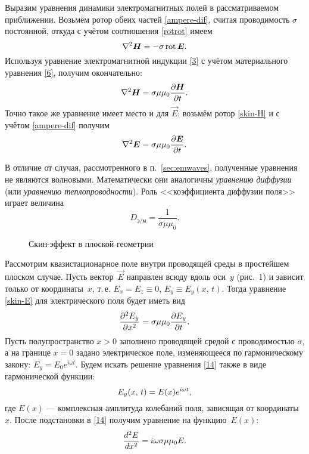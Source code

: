 Выразим уравнения динамики электромагнитных полей в рассматриваемом приближении.
Возьмём ротор обеих частей \eqref{ampere-dif}, считая проводимость $\sigma$ 
постоянной, откуда с учётом соотношения \eqref{rotrot} имеем
\begin{equation*} \eqmark{8}
\nabla^2\vec{H}= -\sigma \Rot \vec{E}.
\end{equation*}
Используя уравнение электромагнитной индукции \eqref{3} с учётом материального 
уравнения \eqref{6}, получим окончательно:
\begin{equation}\eqmark{skin-H}
\nabla^2\vec{H}= \sigma\mu\mu_0 \ddt{\vec{H}}.
\end{equation}
Точно такое же уравнение имеет место и для $\vec{E}$:
возьмём ротор \eqref{skin-H} и с учётом \eqref{ampere-dif} получим
\begin{equation}\eqmark{skin-E}
\nabla^2\vec{E}= \sigma\mu\mu_0 \ddt{\vec{E}}.
\end{equation}

В отличие от случая, рассмотренного в п.~\ref{sec:emwaves}, 
полученные уравнения не являются волновыми. Математически они аналогичны
\emph{уравнению диффузии} (или \emph{уравнению теплопроводности}). Роль 
<<коэффициента диффузии поля>> играет величина
\begin{equation}
D_{э/м} = \frac{1}{\sigma \mu \mu_0}.
\end{equation}


\label{sec:skin}

\begin{wrapfigure}[16]{o}{0.22\textwidth}
    \vspace*{-\baselineskip}
    \caption{Скин-эффект в плоской геометрии}
\end{wrapfigure}
Рассмотрим квазистационарное поле внутри проводящей среды в 
простейшем плоском случае. Пусть вектор~$\vec{E}$ 
направлен всюду вдоль оси~$y$ (рис.~1) и зависит 
только от координаты~$x$, т.\,е. $E_x=E_z\equiv 0$, $E_y\equiv E_y(x,\,t)$. 
Тогда уравнение \eqref{skin-E} для электрического поля будет иметь вид
\begin{equation} \eqmark{14}
\frac{\partial^2E_y}{\partial x^2}= \sigma \mu \mu_0 \ddt{E_y}.
\end{equation}
Пусть полупространство $x>0$ заполнено проводящей средой с проводимостью $\sigma$, 
а на границе $x=0$ задано электрическое поле, изменяющееся по гармоническому закону: 
$E_y=E_0e^{i\omega t}$. Будем
искать решение уравнения \eqref{14} также в виде гармонической функции:
\begin{equation*} \eqmark{15}
E_y(x,\,t)=E(x)e^{i\omega t},
\end{equation*}
где $E(x)$ --- комплексная амплитуда колебаний поля, зависящая от координаты~$x$.
После подстановки в \eqref{14} получим уравнение на функцию~$E(x)$:
\begin{equation} \eqmark{16}
\frac{d^2E}{dx^2}=i\omega\sigma\mu\mu_0 E.
\end{equation}

